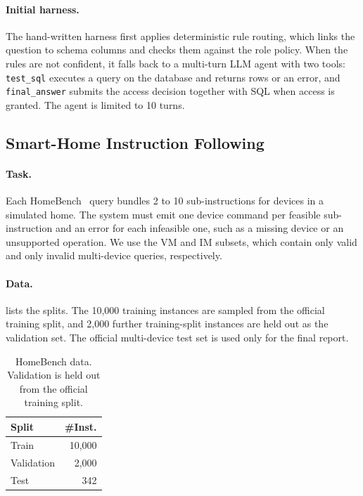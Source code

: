 \documentclass[11pt,a4paper]{article}
\begin{document}
\paragraph{Initial harness.}
The hand-written harness first applies deterministic rule routing, which links the question to schema columns and checks them against the role policy. When the rules are not confident, it falls back to a multi-turn LLM agent with two tools: \texttt{test\_sql} executes a query on the database and returns rows or an error, and \texttt{final\_answer} submits the access decision together with SQL when access is granted. The agent is limited to 10 turns.

\subsection{Smart-Home Instruction Following}
\label{app:homebench}

\paragraph{Task.}
Each HomeBench~\citep{li2025homebenchevaluatingllmssmart} query bundles 2 to 10 sub-instructions for devices in a simulated home. The system must emit one device command per feasible sub-instruction and an error for each infeasible one, such as a missing device or an unsupported operation. We use the VM and IM subsets, which contain only valid and only invalid multi-device queries, respectively.

\paragraph{Data.}
 lists the splits. The 10,000 training instances are sampled from the official training split, and 2,000 further training-split instances are held out as the validation set. The official multi-device test set is used only for the final report.

\begin{table}[t]
\centering
\footnotesize
\caption{HomeBench data. Validation is held out from the official training split.}
\label{tab:app-homebench-data}
\renewcommand{\arraystretch}{1.05}
\setlength{\tabcolsep}{5pt}
\begin{tabular}{lr}
\toprule
\textbf{Split} & \textbf{\#Inst.} \\
\midrule
Train & 10,000 \\
Validation & 2,000 \\
Test & 342 \\
\bottomrule
\end{tabular}
\end{table}
\end{document}
